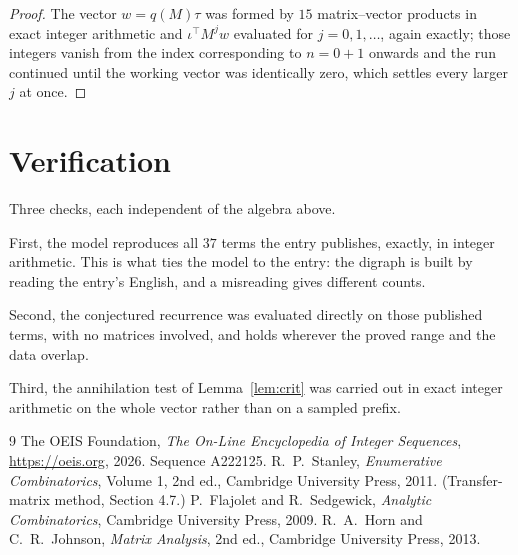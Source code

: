 \documentclass[11pt,a4paper]{article}
\theoremstyle{plain}
\theoremstyle{definition}
\begin{document}
\begin{proof}
The vector $w=q(M)\tau$ was formed by $15$ matrix--vector products in exact integer
arithmetic and $\iota^{\!\top}M^{j}w$ evaluated for $j=0,1,\dots$, again exactly; those
integers vanish from the index corresponding to $n=0+1$ onwards and the run continued
until the working vector was identically zero, which settles every larger $j$ at once.
\end{proof}

\section{Verification}

Three checks, each independent of the algebra above.

First, the model reproduces all $37$ terms the entry publishes, exactly, in integer
arithmetic. This is what ties the model to the entry: the digraph is built by reading the
entry's English, and a misreading gives different counts.

Second, the conjectured recurrence was evaluated directly on those published terms, with no
matrices involved, and holds wherever the proved range and the data overlap.

Third, the annihilation test of Lemma~\ref{lem:crit} was carried out in exact integer
arithmetic on the whole vector rather than on a sampled prefix.

\begin{thebibliography}{9}
 The OEIS Foundation, \emph{The On-Line Encyclopedia of Integer
Sequences}, \url{https://oeis.org}, 2026. Sequence A222125.
 R.~P.~Stanley, \emph{Enumerative Combinatorics}, Volume 1, 2nd ed.,
Cambridge University Press, 2011. (Transfer-matrix method, Section 4.7.)
 P.~Flajolet and R.~Sedgewick, \emph{Analytic Combinatorics}, Cambridge
University Press, 2009.
 R.~A.~Horn and C.~R.~Johnson, \emph{Matrix Analysis}, 2nd ed., Cambridge
University Press, 2013.
\end{thebibliography}
\end{document}
